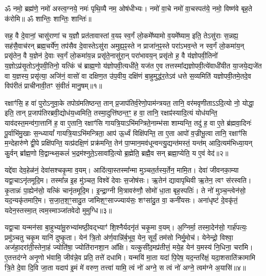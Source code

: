 
\setcounter{anuvakam}{0}
ॐ नमो॒ ब्रह्म॑णे॒ नमो॑ अस्त्व॒ग्नये॒ नमः॑ पृथि॒व्यै नम॒ ओष॑धीभ्यः। 
नमो॑ वा॒चे नमो॑ वा॒चस्पत॑ये॒ नमो॒ विष्ण॑वे बृह॒ते क॑रोमि॥
ॐ शान्तिः॒ शान्तिः॒ शान्तिः॑॥

सह॒ वै दे॒वानां॒ चासु॑राणां च य॒ज्ञौ प्रत॑तावास्तां व॒यꣴ स्व॒र्गं लो॒कमे᳚ष्यामो व॒यमे᳚ष्याम॒ इति॒ तेऽसु॑राः स॒न्नह्य॒ सह॑सै॒वाच॑रन् ब्रह्म॒चर्ये॑ण॒ तप॑सैव दे॒वास्तेऽसु॑रा अमुह्य॒ꣴ॒स्ते न प्राजा॑न॒ꣴ॒स्ते परा॑ऽभव॒न्ते न स्व॒र्गं लो॒कमा॑य॒न् प्रसृ॑तेन॒ वै य॒ज्ञेन॑ दे॒वाः स्व॒र्गं लो॒कमा॑य॒न्न प्रसृ॑ते॒नासु॑रा॒न् परा॑भावय॒न् प्रसृ॑तो ह॒ वै य॑ज्ञोपवी॒तिनो॑ य॒ज्ञोऽप्र॑सृ॒तोऽनु॑पवी॒तिनो॒ यत्किं च॑ ब्राह्म॒णो य॑ज्ञोपवी॒त्यधी॑ते॒ यज॑त ए॒व तत्तस्मा᳚द्यज्ञोपवी॒त्ये॑वाधी॑यीत या॒जये॒द्यजे॑त वा य॒ज्ञस्य॒ प्रसृ॑त्या॒ अजि॑नं॒ वासो॑ वा दक्षिण॒त उ॑प॒वीय॒ दक्षि॑णं बा॒हुमुद्ध॑र॒तेऽव॑ धत्ते स॒व्यमिति॑ यज्ञोपवी॒तमे॒तदे॒व विप॑रीतं प्राचीनावी॒तꣳ सं॒वीतं॑ मानु॒षम्॥१॥\anuvakamend

रक्षाꣳ॑सि॒ ह वा॑ पुरोऽनुवा॒के तपोग्र॑मतिष्ठन्त॒ तान् प्र॒जाप॑तिर्व॒रेणो॒पा\-म॑न्त्रयत॒ तानि॒ वर॑मवृणीताऽऽदि॒त्यो नो॒ योद्धा॒ इति॒ तान् प्र॒जाप॑तिरब्रवी॒द्योध॑य॒ध्वमिति॒ तस्मा॒दुत्ति॑ष्ठन्त॒ꣳ॒ ह वा॒ तानि॒ रक्षाꣴ॑स्यादि॒त्यं योध॑यन्ति॒ याव॑दस्त॒मन्व॑गा॒त्तानि॑ ह॒ वा ए॒तानि॒ रक्षाꣳ॑सि गायत्रि॒या\-ऽभि॑मन्त्रिते॒नाम्भ॑सा शाम्यन्ति॒ तदु॑ ह॒ वा ए॒ते ब्र॑ह्मवा॒दिनः॑ पू॒र्वाभि॑मु॒खाः स॒न्ध्यायां᳚ गायत्रि॒या\-ऽभि॑मन्त्रिता॒ आप॑ ऊ॒र्ध्वं विक्षि॑पन्ति॒ ता ए॒ता आपो॑ व॒ज्रीभू॒त्वा तानि॒ रक्षाꣳ॑सि म॒न्देहारु॑णे द्वी॒पे प्रक्षि॑पन्ति॒ यत्प्र॑दक्षि॒णं प्रक्र॑मन्ति॒ तेन॑ पा॒प्मान॒मव॑धून्वन्त्यु॒द्यन्त॑मस्तं॒ यन्त॑म् आदि॒त्यम॑भिध्या॒यन् कु॒र्वन् ब्रा᳚ह्म॒णो वि॒द्वान्थ्स॒कलं॑ भ॒द्रम॑श्नुते॒ऽसावा॑दि॒त्यो ब्र॒ह्मेति॒ ब्रह्मै॒व सन् ब्रह्मा॒प्येति॒ य ए॒वं वेद॑॥२॥\anuvakamend

यद्दे॑वा देव॒हेळ॑नं॒ देवा॑सश्चकृ॒मा व॒यम्। 
आदि॑त्या॒स्तस्मा᳚न्मा मुञ्चत॒र्तस्य॒र्तेन॒ मामि॒त। 
देवा॑ जीवनका॒म्या यद्वा॒चाऽनृ॑त\-मूदि॒म। 
तस्मा᳚न्न इ॒ह मु॑ञ्चत॒ विश्वे॑ देवाः स॒जोष॑सः। 
ऋ॒तेन॑ द्यावापृथिवी ऋ॒तेन॒ त्वꣳ स॑रस्वति। 
कृ॒तान्नः॑ पा॒ह्येन॑सो॒ यत्किं चानृ॑त\-मूदि॒म। 
इ॒न्द्रा॒ग्नी मि॒त्रावरु॑णौ॒ सोमो॑ धा॒ता बृह॒स्पतिः॑। 
ते नो॑ मुञ्च॒न्त्वेन॑सो॒ यद॒न्यकृ॑तमारि॒म। 
स॒जा॒त॒श॒ꣳ॒सादु॒त जा॑मिश॒ꣳ॒साज्ज्याय॑सः॒ शꣳसा॑दु॒त वा॒ कनी॑यसः। 
अना॑धृष्टं दे॒वकृ॑तं॒ यदेन॒स्तस्मा॒त् त्वम॒स्माञ्जा॑तवेदो मुमुग्धि॥३॥

यद्वा॒चा यन्मन॑सा बा॒हुभ्या॑मू॒रुभ्या॑मष्ठी॒वद्भ्याꣳ॑ शि॒श्नैर्यदनृ॑तं चकृ॒मा व॒यम्। 
अ॒ग्निर्मा॒ तस्मा॒देन॑सो॒ गार्\mbox{}ह॑पत्यः॒ प्रमु॑ञ्चतु चकृ॒म यानि॑ दुष्कृ॒ता। 
येन॑ त्रि॒तो अ॑र्ण॒वान्नि॑र्ब॒भूव॒ येन॒ सूर्यं॒ तम॑सो निर्मु॒मोच॑। 
येनेन्द्रो॒ विश्वा॒ अज॑हा॒दरा॑ती॒स्तेना॒हं ज्योति॑षा॒ ज्योति॑रानशा॒न आ᳚क्षि। 
यत्कुसी॑द॒मप्र॑तीत्तं॒ मये॒ह येन॑ य॒मस्य॑ नि॒धिना॒ चरा॑मि। 
ए॒तत्तद॑ग्ने अनृ॒णो भ॑वामि॒ जीव॑न्ने॒व प्रति॒ तत्ते॑ दधामि। 
यन्मयि॑ मा॒ता यदा॑ पि॒पेष॒ यद॒न्तरि॑क्षं॒ यदा॒शसाति॑क्रामामि त्रि॒ते दे॒वा दि॒वि जा॒ता यदाप॑ इ॒मं मे॑ वरुण॒ तत्त्वा॑ यामि॒ त्वं नो॑ अग्ने॒ स त्वं नो॑ अग्ने॒ त्वम॑ग्ने अ॒यासि॑॥४॥\anuvakamend

